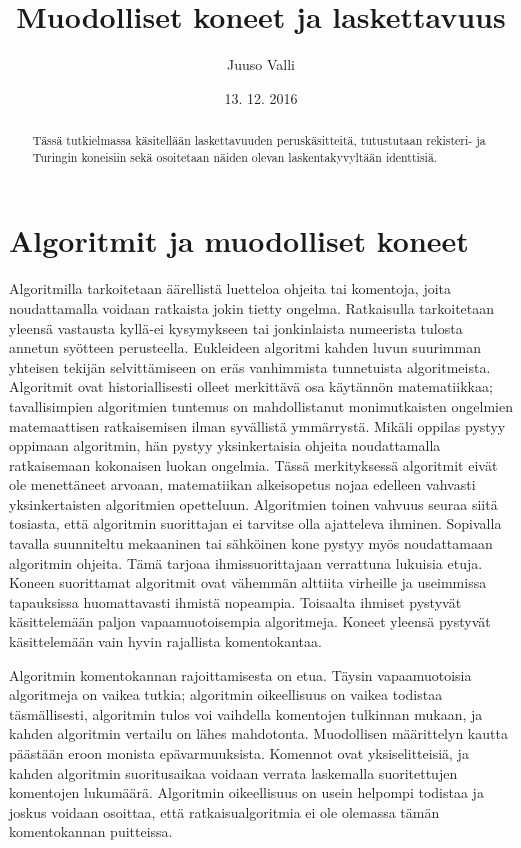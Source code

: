 \documentclass[a4paper, 12pt]{article}
\theoremstyle{definition}
\theoremstyle{plain}
\begin{document}
\title{Muodolliset koneet ja laskettavuus}
\author{Juuso Valli}
\date{13. 12. 2016}

\maketitle

\begin{abstract}
Tässä tutkielmassa käsitellään laskettavuuden peruskäsitteitä, 
tutustutaan rekisteri- ja Turingin koneisiin 
sekä osoitetaan näiden olevan laskentakyvyltään identtisiä.
\end{abstract}

\tableofcontents

\newpage

\section{Algoritmit ja muodolliset koneet}
Algoritmilla tarkoitetaan äärellistä luetteloa ohjeita tai komentoja, joita noudattamalla voidaan ratkaista jokin tietty ongelma. Ratkaisulla tarkoitetaan yleensä vastausta kyllä-ei kysymykseen tai jonkinlaista numeerista tulosta annetun syötteen perusteella. Eukleideen algoritmi kahden luvun suurimman yhteisen tekijän selvittämiseen on eräs vanhimmista tunnetuista algoritmeista. Algoritmit ovat historiallisesti olleet merkittävä osa käytännön matematiikkaa; tavallisimpien algoritmien tuntemus on mahdollistanut monimutkaisten ongelmien matemaattisen ratkaisemisen ilman syvällistä ymmärrystä. Mikäli oppilas pystyy oppimaan algoritmin, hän pystyy yksinkertaisia ohjeita noudattamalla ratkaisemaan kokonaisen luokan ongelmia. Tässä merkityksessä algoritmit eivät ole menettäneet arvoaan, matematiikan alkeisopetus nojaa edelleen vahvasti yksinkertaisten algoritmien opetteluun. Algoritmien toinen vahvuus seuraa siitä tosiasta, että algoritmin suorittajan ei tarvitse olla ajatteleva ihminen. Sopivalla tavalla suunniteltu mekaaninen tai sähköinen kone pystyy myös noudattamaan algoritmin ohjeita. Tämä tarjoaa ihmissuorittajaan verrattuna lukuisia etuja. Koneen suorittamat algoritmit ovat vähemmän alttiita virheille ja useimmissa tapauksissa huomattavasti ihmistä nopeampia. Toisaalta ihmiset pystyvät käsittelemään paljon vapaamuotoisempia algoritmeja. Koneet yleensä pystyvät käsittelemään vain hyvin rajallista komentokantaa. 

Algoritmin komentokannan rajoittamisesta on etua. Täysin vapaamuotoisia algoritmeja on vaikea tutkia; algoritmin oikeellisuus on vaikea todistaa täsmällisesti, algoritmin tulos voi vaihdella komentojen tulkinnan mukaan, ja kahden algoritmin vertailu on lähes mahdotonta. Muodollisen määrittelyn kautta päästään eroon monista epävarmuuksista. Komennot ovat yksiselitteisiä, ja kahden algoritmin suoritusaikaa voidaan verrata laskemalla suoritettujen komentojen lukumäärä. Algoritmin oikeellisuus on usein helpompi todistaa ja joskus voidaan osoittaa, että ratkaisualgoritmia ei ole olemassa tämän komentokannan puitteissa.
\end{document}
